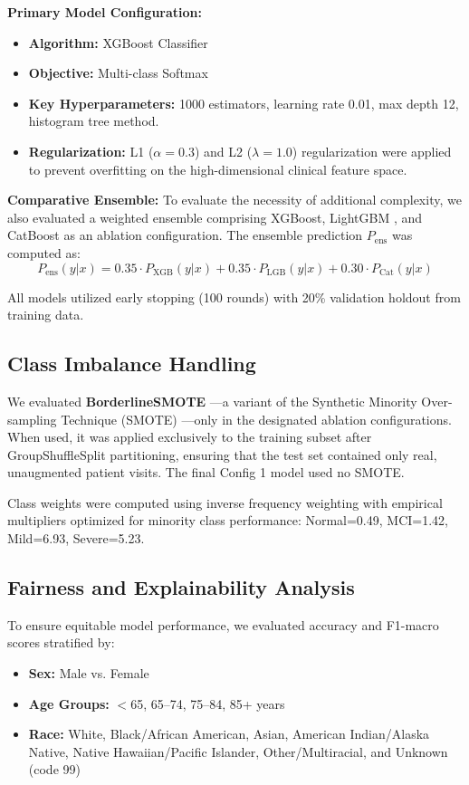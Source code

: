 \documentclass[preprint,12pt]{elsarticle}
\begin{document}
\textbf{Primary Model Configuration:}
\begin{itemize}
    \item \textbf{Algorithm:} XGBoost Classifier
    \item \textbf{Objective:} Multi-class Softmax
    \item \textbf{Key Hyperparameters:} 1000 estimators, learning rate 0.01, max depth 12, histogram tree method.
    \item \textbf{Regularization:} L1 ($\alpha=0.3$) and L2 ($\lambda=1.0$) regularization were applied to prevent overfitting on the high-dimensional clinical feature space.
\end{itemize}

\textbf{Comparative Ensemble:}
To evaluate the necessity of additional complexity, we also evaluated a weighted ensemble comprising XGBoost, LightGBM \cite{ke2017}, and CatBoost \cite{prokhorenkova2018} as an ablation configuration. The ensemble prediction $P_{\text{ens}}$ was computed as:
\begin{equation}
    P_{\text{ens}}(y|x) = 0.35 \cdot P_{\text{XGB}}(y|x) + 0.35 \cdot P_{\text{LGB}}(y|x) + 0.30 \cdot P_{\text{Cat}}(y|x)
\end{equation}

All models utilized early stopping (100 rounds) with 20\% validation holdout from training data.

\subsection{Class Imbalance Handling}

We evaluated \textbf{BorderlineSMOTE} \cite{han2005}---a variant of the Synthetic Minority Over-sampling Technique (SMOTE) \cite{chawla2002}---only in the designated ablation configurations. When used, it was applied exclusively to the training subset after GroupShuffleSplit partitioning, ensuring that the test set contained only real, unaugmented patient visits. The final Config 1 model used no SMOTE.

Class weights were computed using inverse frequency weighting with empirical multipliers optimized for minority class performance: Normal=0.49, MCI=1.42, Mild=6.93, Severe=5.23.

\subsection{Fairness and Explainability Analysis}

To ensure equitable model performance, we evaluated accuracy and F1-macro scores stratified by:
\begin{itemize}
    \item \textbf{Sex:} Male vs. Female
    \item \textbf{Age Groups:} $<$65, 65--74, 75--84, 85+ years
    \item \textbf{Race:} White, Black/African American, Asian, American Indian/Alaska Native, Native Hawaiian/Pacific Islander, Other/Multiracial, and Unknown (code 99)
\end{itemize}
\end{document}
